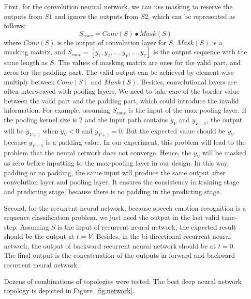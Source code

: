 \documentclass[a4paper]{article}
\begin{document}
First, for the convolution neutral network, we can use masking to reserve the outputs from $S1$ and ignore the outputs from $S2$, which can be represented as follows:
\begin{equation}
\label{eq:masking}
S_{conv}=Conv(S) \bullet Mask(S)
\end{equation}
where $Conv(S)$ is the output of convolution layer for $S$, $Mask(S)$ is a masking matrix, and $S_{conv}=[y_1, y_2, ..., y_V, ..., y_T]$ is the output sequence with the same length as $S$. The values of masking matrix are ones for the valid part, and zeros for the padding part. The valid output can be achieved by element-wise multiply between $Conv(S)$ and $Mask(S)$. Besides, convolutional layers are often interweaved with pooling layers. We need to take care of the border value between the valid part and the padding part, which could introduce the invalid information. For example, assuming $S_{conv}$ is the input of the max-pooling layer. If the pooling kernel size is 2 and the input path contains $y_V$ and $y_{V+1}$, the output will be $y_{V+1}$ when $y_V<0$ and $y_{V+1}=0$. But the expected value should be $y_V$ because $y_{V+1}$ is a padding value. In our experiment, this problem will lead to the problem that the neural network does not converge. Hence, the $y_V$ will be masked as zero before inputting to the max-pooling layer in our design. In this way, padding or no padding, the same input will produce the same output after convolution layer and pooling layer. It ensures the consistency in training stage and predicting stage, because there is no padding in the predicting stage.

Second, for the recurrent neural network, because speech emotion recognition is a sequence classification problem, we just need the output in the last valid time-step. Assuming $S$ is the input of recurrent neural network, the expected result should be the output at $t=V$. Besides, in the bi-directional recurrent neural network, the output of backward recurrent neural network should be at $t=0$. The final output is the concatenation of the outputs in forward and backward recurrent neural network.

Dozens of combinations of topologies were tested. The best deep neural network topology is depicted in Figure~\ref{fig:network}.
\end{document}

